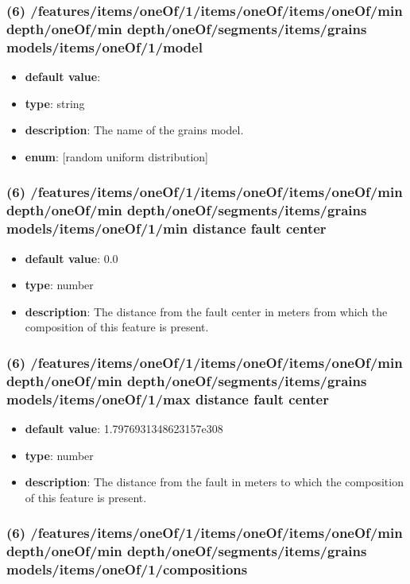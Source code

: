 \subsubsection{(6) /features/items/oneOf/1/items/oneOf/items/oneOf/min depth/oneOf/min depth/oneOf/segments/items/grains models/items/oneOf/1/model}
\begin{itemize}[leftmargin=6em]\item {\bf default value}: 
\item {\bf type}: string
\item {\bf description}: The name of the grains model.
\item {\bf enum}: [random uniform distribution]\end{itemize}\subsubsection{(6) /features/items/oneOf/1/items/oneOf/items/oneOf/min depth/oneOf/min depth/oneOf/segments/items/grains models/items/oneOf/1/min distance fault center}
\begin{itemize}[leftmargin=6em]\item {\bf default value}: 0.0
\item {\bf type}: number
\item {\bf description}: The distance from the fault center in meters from which the composition of this feature is present.
\end{itemize}\subsubsection{(6) /features/items/oneOf/1/items/oneOf/items/oneOf/min depth/oneOf/min depth/oneOf/segments/items/grains models/items/oneOf/1/max distance fault center}
\begin{itemize}[leftmargin=6em]\item {\bf default value}: 1.7976931348623157e308
\item {\bf type}: number
\item {\bf description}: The distance from the fault in meters to which the composition of this feature is present.
\end{itemize}\subsubsection{(6) /features/items/oneOf/1/items/oneOf/items/oneOf/min depth/oneOf/min depth/oneOf/segments/items/grains models/items/oneOf/1/compositions}
